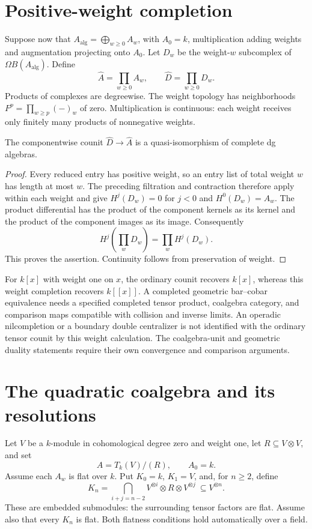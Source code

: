 \section{Positive-weight completion}
Suppose now that $A_{\mathrm{alg}}=\bigoplus_{w\geq0}A_w$, with $A_0=k$, multiplication adding weights and augmentation projecting onto $A_0$.
Let $D_w$ be the weight-$w$ subcomplex of $\Omega B(A_{\mathrm{alg}})$.
Define
\[
 \widehat A=\prod_{w\geq0}A_w,\qquad
 \widehat D=\prod_{w\geq0}D_w.
\]
Products of complexes are degreewise.
The weight topology has neighborhoods $F^p=\prod_{w\geq p}(-)_w$ of zero.
Multiplication is continuous: each weight receives only finitely many products of nonnegative weights.

\begin{theorem}\label{cbc:reconstruction:complete}
The componentwise counit $\widehat D\to\widehat A$ is a quasi-isomorphism of complete dg algebras.
\end{theorem}
\begin{proof}
Every reduced entry has positive weight, so an entry list of total weight $w$ has length at most $w$.
The preceding filtration and contraction therefore apply within each weight and give
$H^j(D_w)=0$ for $j<0$ and $H^0(D_w)=A_w$.
The product differential has the product of the component kernels as its kernel and the product of the component images as its image.
Consequently
\[
 H^j\left(\prod_wD_w\right)=\prod_wH^j(D_w).
\]
This proves the assertion.
Continuity follows from preservation of weight.
\end{proof}

For $k[x]$ with weight one on $x$, the ordinary counit recovers $k[x]$,
whereas this weight completion recovers $k[[x]]$.
A completed geometric bar--cobar equivalence needs a specified completed tensor product,
coalgebra category, and comparison maps compatible with collision and inverse limits.
An operadic nilcompletion or a boundary double centralizer is not identified
with the ordinary tensor counit by this weight calculation.
The coalgebra-unit and geometric duality statements require their own convergence and comparison arguments.

\section{The quadratic coalgebra and its resolutions}
Let $V$ be a $k$-module in cohomological degree zero and weight one, let $R\subseteq V\otimes V$, and set
\[
 A=T_k(V)/(R),\qquad A_0=k.
\]
Assume each $A_w$ is flat over $k$.
Put $K_0=k$, $K_1=V$, and, for $n\geq2$, define
\begin{equation}\label{eq:cbc:quadratic:intersection}
 K_n=\bigcap_{i+j=n-2}V^{\otimes i}\otimes R\otimes V^{\otimes j}
       \ \subseteq V^{\otimes n}.
\end{equation}
These are embedded submodules: the surrounding tensor factors are flat.
Assume also that every $K_n$ is flat.
Both flatness conditions hold automatically over a field.


